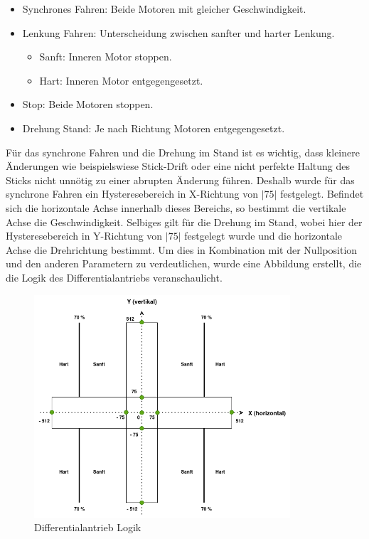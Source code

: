\begin{itemize}
    \item Synchrones Fahren: Beide Motoren mit gleicher Geschwindigkeit.
    \item Lenkung Fahren: Unterscheidung zwischen sanfter und harter Lenkung.
    \begin{itemize}
        \item Sanft: Inneren Motor stoppen.
        \item Hart: Inneren Motor entgegengesetzt.
    \end{itemize}
    \item Stop: Beide Motoren stoppen.
    \item Drehung Stand: Je nach Richtung Motoren entgegengesetzt.
\end{itemize}

Für das synchrone Fahren und die Drehung im Stand ist es wichtig, dass kleinere Änderungen wie beispielswiese Stick-Drift oder eine nicht perfekte Haltung des Sticks nicht unnötig zu einer abrupten Änderung führen. Deshalb wurde für das synchrone Fahren ein Hysteresebereich in X-Richtung von $|75|$ festgelegt. Befindet sich die horizontale Achse innerhalb dieses Bereichs, so bestimmt die vertikale Achse die Geschwindigkeit. Selbiges gilt für die Drehung im Stand, wobei hier der Hysteresebereich in Y-Richtung von $|75|$ festgelegt wurde und die horizontale Achse die Drehrichtung bestimmt. Um dies in Kombination mit der Nullposition und den anderen Parametern zu verdeutlichen, wurde eine Abbildung erstellt, die die Logik des Differentialantriebs veranschaulicht. \newline

\begin{figure}[H]
    \centering
    \includegraphics[width=0.85\textwidth]{images/diff_drive_logic.png}
    \caption{Differentialantrieb Logik}
    \label{fig:diff_drive_logic}
\end{figure}

